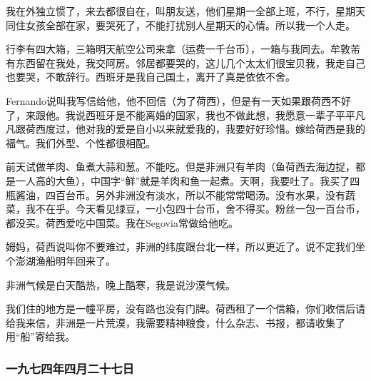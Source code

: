 \par 我在外独立惯了，来去都很自在，叫朋友送，他们星期一全部上班，不行，星期天同住女孩全部在家，要哭死了，不能打扰别人星期天的心情。所以我一个人走。
\par 行李有四大箱，三箱明天航空公司来拿（运费一千台币），一箱与我同去。牟敦芾有东西留在我处，我交阿房。邻居都要哭的，这儿几个太太们很宝贝我，我走自己也要哭，不敢辞行。西班牙是我自己国土，离开了真是依依不舍。
\par Fernando说叫我写信给他，他不回信（为了荷西），但是有一天如果跟荷西不好了，来跟他。我说西班牙是不能离婚的国家，我也不做此想，我愿意一辈子平平凡凡跟荷西度过，他对我的爱是自小以来就爱我的，我要好好珍惜。嫁给荷西是我的福气。我们外型、个性都很相配。
\par 前天试做羊肉、鱼煮大蒜和葱。不能吃。但是非洲只有羊肉（鱼荷西去海边捉，都是一人高的大鱼），中国字“鲜”就是羊肉和鱼一起煮。天啊，我要吐了。我买了四瓶酱油，四百台币。另外非洲没有淡水，所以不能常常喝汤。没有水果，没有蔬菜，我不在乎。今天看见绿豆，一小包四十台币，舍不得买。粉丝一包一百台币，都没买。荷西爱吃中国菜。我在Segovia常做给他吃。
\par 姆妈，荷西说叫你不要难过，非洲的纬度跟台北一样，所以更近了。说不定我们坐个澎湖渔船明年回来了。
\par 非洲气候是白天酷热，晚上酷寒，我是说沙漠气候。
\par 我们住的地方是一幢平房，没有路也没有门牌。荷西租了一个信箱，你们收信后请给我来信，非洲是一片荒漠，我需要精神粮食，什么杂志、书报，都请收集了用“船”寄给我。
\par {}

\subsubsection{一九七四年四月二十七日}

